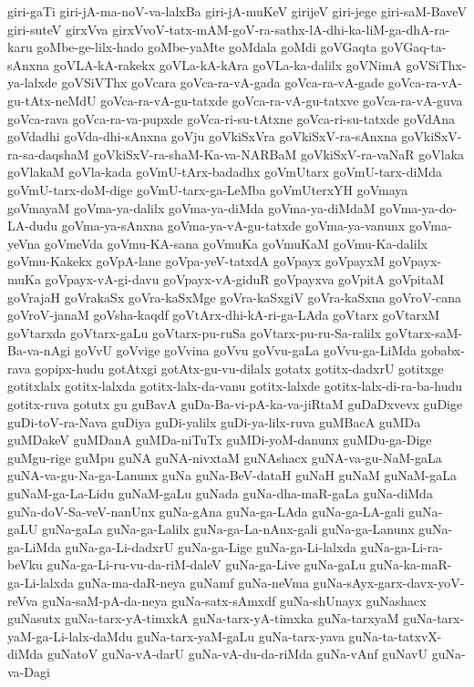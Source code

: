 {giri-gaTi
giri-jA-ma-noV-va-lalxBa
giri-jA-muKeV
girijeV
giri-jege
giri-saM-BaveV
giri-suteV
girxVva
girxVvoV-tatx-mAM-goV-ra-sathx-lA-dhi-ka-liM-ga-dhA-ra-karu
goMbe-ge-lilx-hado
goMbe-yaMte
goMdala
goMdi
goVGaqta
goVGaq-ta-sAnxna
goVLA-kA-rakekx
goVLa-kA-kAra
goVLa-ka-dalilx
goVNimA
goVSiThx-ya-lalxde
goVSiVThx
goVcara
goVca-ra-vA-gada
goVca-ra-vA-gade
goVca-ra-vA-gu-tAtx-neMdU
goVca-ra-vA-gu-tatxde
goVca-ra-vA-gu-tatxve
goVca-ra-vA-guva
goVca-rava
goVca-ra-va-pupxde
goVca-ri-su-tAtxne
goVca-ri-su-tatxde
goVdAna
goVdadhi
goVda-dhi-sAnxna
goVju
goVkiSxVra
goVkiSxV-ra-sAnxna
goVkiSxV-ra-sa-daqshaM
goVkiSxV-ra-shaM-Ka-va-NARBaM
goVkiSxV-ra-vaNaR
goVlaka
goVlakaM
goVla-kada
goVmU-tArx-badadhx
goVmUtarx
goVmU-tarx-diMda
goVmU-tarx-doM-dige
goVmU-tarx-ga-LeMba
goVmUterxYH
goVmaya
goVmayaM
goVma-ya-dalilx
goVma-ya-diMda
goVma-ya-diMdaM
goVma-ya-do-LA-dudu
goVma-ya-sAnxna
goVma-ya-vA-gu-tatxde
goVma-ya-vanunx
goVma-yeVna
goVmeVda
goVmu-KA-sana
goVmuKa
goVmuKaM
goVmu-Ka-dalilx
goVmu-Kakekx
goVpA-lane
goVpa-yeV-tatxdA
goVpayx
goVpayxM
goVpayx-muKa
goVpayx-vA-gi-davu
goVpayx-vA-giduR
goVpayxva
goVpitA
goVpitaM
goVrajaH
goVrakaSx
goVra-kaSxMge
goVra-kaSxgiV
goVra-kaSxna
goVroV-cana
goVroV-janaM
goVsha-kaqdf
goVtArx-dhi-kA-ri-ga-LAda
goVtarx
goVtarxM
goVtarxda
goVtarx-gaLu
goVtarx-pu-ruSa
goVtarx-pu-ru-Sa-ralilx
goVtarx-saM-Ba-va-nAgi
goVvU
goVvige
goVvina
goVvu
goVvu-gaLa
goVvu-ga-LiMda
gobabx-rava
gopipx-hudu
gotAtxgi
gotAtx-gu-vu-dilalx
gotatx
gotitx-dadxrU
gotitxge
gotitxlalx
gotitx-lalxda
gotitx-lalx-da-vanu
gotitx-lalxde
gotitx-lalx-di-ra-ba-hudu
gotitx-ruva
gotutx
gu
guBavA
guDa-Ba-vi-pA-ka-va-jiRtaM
guDaDxvevx
guDige
guDi-toV-ra-Nava
guDiya
guDi-yalilx
guDi-ya-lilx-ruva
guMBacA
guMDa
guMDakeV
guMDanA
guMDa-niTuTx
guMDi-yoM-danunx
guMDu-ga-Dige
guMgu-rige
guMpu
guNA
guNA-nivxtaM
guNAshacx
guNA-va-gu-NaM-gaLa
guNA-va-gu-Na-ga-Lanunx
guNa
guNa-BeV-dataH
guNaH
guNaM
guNaM-gaLa
guNaM-ga-La-Lidu
guNaM-gaLu
guNada
guNa-dha-maR-gaLa
guNa-diMda
guNa-doV-Sa-veV-nanUnx
guNa-gAna
guNa-ga-LAda
guNa-ga-LA-gali
guNa-gaLU
guNa-gaLa
guNa-ga-Lalilx
guNa-ga-La-nAnx-gali
guNa-ga-Lanunx
guNa-ga-LiMda
guNa-ga-Li-dadxrU
guNa-ga-Lige
guNa-ga-Li-lalxda
guNa-ga-Li-ra-beVku
guNa-ga-Li-ru-vu-da-riM-daleV
guNa-ga-Live
guNa-gaLu
guNa-ka-maR-ga-Li-lalxda
guNa-ma-daR-neya
guNamf
guNa-neVma
guNa-sAyx-garx-davx-yoV-reVva
guNa-saM-pA-da-neya
guNa-satx-sAmxdf
guNa-shUnayx
guNashacx
guNasutx
guNa-tarx-yA-timxkA
guNa-tarx-yA-timxka
guNa-tarxyaM
guNa-tarx-yaM-ga-Li-lalx-daMdu
guNa-tarx-yaM-gaLu
guNa-tarx-yava
guNa-ta-tatxvX-diMda
guNatoV
guNa-vA-darU
guNa-vA-du-da-riMda
guNa-vAnf
guNavU
guNa-va-Dagi
}

